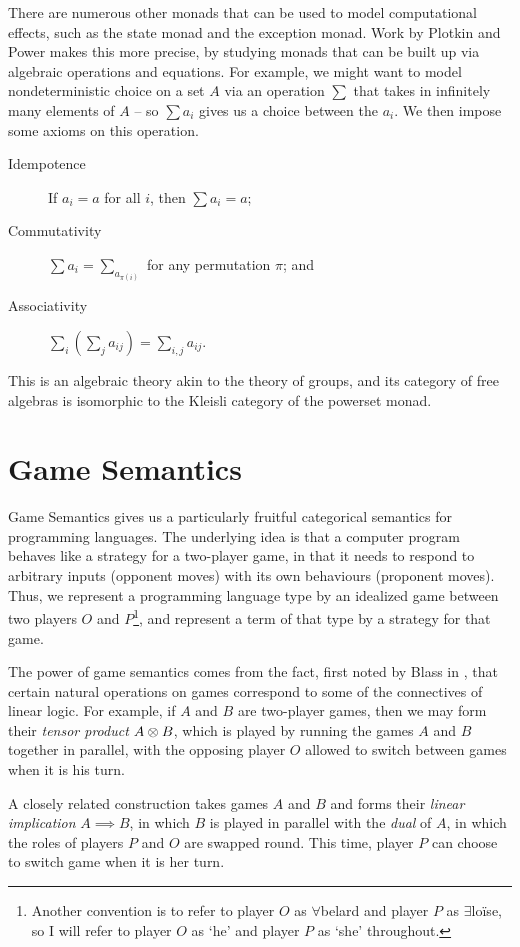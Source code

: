There are numerous other monads that can be used to model computational effects, such as the state monad and the exception monad.  
Work by Plotkin and Power \cite{PlotkinPower} makes this more precise, by studying monads that can be built up via algebraic operations and equations.  
For example, we might want to model nondeterministic choice on a set $A$ via an operation $\sum$ that takes in infinitely many elements of $A$ -- so $\sum a_i$ gives us a choice between the $a_i$.  
We then impose some axioms on this operation.
\begin{description}
  \item[Idempotence] If $a_i=a$ for all $i$, then $\sum a_i=a$;
  \item[Commutativity] $\sum a_i = \sum_{a_{\pi(i)}}$ for any permutation $\pi$; and
  \item[Associativity] $\sum_i (\sum_j a_{ij}) = \sum_{i,j} a_{ij}$.
\end{description}
This is an algebraic theory akin to the theory of groups, and its category of free algebras is isomorphic to the Kleisli category of the powerset monad.

\section{Game Semantics}

Game Semantics gives us a particularly fruitful categorical semantics for programming languages.  
The underlying idea is that a computer program behaves like a strategy for a two-player game, in that it needs to respond to arbitrary inputs (opponent moves) with its own behaviours (proponent moves).  
Thus, we represent a programming language type by an idealized game between two players $O$ and $P$\footnote{Another convention is to refer to player $O$ as $\forall{}$belard and player $P$ as $\exists{}$lo\"{i}se, so I will refer to player $O$ as `he' and player $P$ as `she' throughout.}, and represent a term of that type by a strategy for that game.

The power of game semantics comes from the fact, first noted by Blass in \cite{blassgames}, that certain natural operations on games correspond to some of the connectives of linear logic.  
For example, if $A$ and $B$ are two-player games, then we may form their \emph{tensor product} $A\otimes B$, which is played by running the games $A$ and $B$ together in parallel, with the opposing player $O$ allowed to switch between games when it is his turn.

A closely related construction takes games $A$ and $B$ and forms their \emph{linear implication} $A\implies B$, in which $B$ is played in parallel with the \emph{dual} of $A$, in which the roles of players $P$ and $O$ are swapped round.  
This time, player $P$ can choose to switch game when it is her turn.

